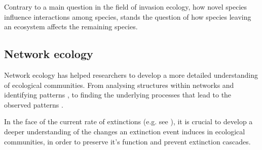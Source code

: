 \documentclass[12pt,a4paper]{article}
\begin{document}
Contrary to a main question in the field of invasion ecology, how novel species influence interactions among species, stands the question of how species leaving an ecosystem affects the remaining species. 


%
\subsection{Network ecology}
Network ecology has helped researchers to develop a more detailed understanding of ecological communities. From analysing structures within networks and identifying patterns \parencite{Jordano1987, Dunne2002 }, %
to finding the underlying processes that lead to the observed patterns \parencite{Rezende2007, Vazquez2009, Thebault2010}.

In the face of the current rate of extinctions (e.g. see \cite{IPBES}), it is crucial to develop a deeper understanding of the changes an extinction event induces in ecological communities, in order to preserve it's function and prevent extinction cascades. 

	

\end{document}
